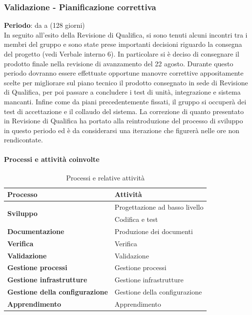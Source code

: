 			\newpage
			\subsubsection {Validazione - Pianificazione correttiva}
			\textbf{Periodo}: da  a  (128 giorni) \\
			In seguito all'esito della Revisione di Qualifica, si sono tenuti alcuni incontri tra i membri del gruppo e sono state prese importanti decisioni riguardo la consegna del progetto (vedi Verbale interno 6). In particolare si è deciso di consegnare il prodotto finale nella revisione di avanzamento del 22 agosto. Durante questo periodo dovranno essere effettuate opportune manovre correttive appositamente scelte per migliorare sul piano tecnico il prodotto consegnato in sede di Revisione di Qualifica, per poi passare a concludere i test di unità, integrazione e sistema mancanti. Infine come da piani precedentemente fissati, il gruppo si occuperà dei test di accettazione e il collaudo del sistema. La correzione di quanto presentato in Revisione di Qualifica ha portato alla reintroduzione del processo di sviluppo in questo periodo ed è da considerarsi una iterazione che figurerà nelle ore non rendicontate.
			\paragraph{Processi e attività coinvolte}
			\begin{table}[H]
				\centering
				\begin{tabular}{ll}
					\toprule
					\textbf{Processo}                           & \textbf{Attività}              \\
					\midrule
					\multirow{2}{*}{\textbf{Sviluppo}}          & Progettazione ad basso livello \\
					& Codifica e test \\
					\midrule
					\textbf{Documentazione}            & Produzione dei documenti       \\
					\midrule
					\textbf{Verifica}                  & Verifica                       \\
					\midrule
					\textbf{Validazione}               & Validazione                    \\
					\midrule
					\textbf{Gestione processi} 					& Gestione processi              \\
					\midrule
					\textbf{Gestione infrastrutture}				& Gestione infrastrutture        \\
					\midrule
					\textbf{Gestione della configurazione}				& Gestione della configurazione        \\
					\midrule
					\textbf{Apprendimento} 						& Apprendimento                 \\
					\bottomrule
				\end{tabular}
				\caption{Processi e relative attività}
				\label{VaCorr-ProcessiAttività}
			\end{table}
